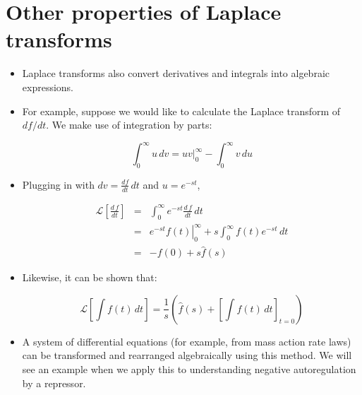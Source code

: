 \documentclass{article}
\newcommand{\Lapl}{\mathcal{L}}
\begin{document}
\section*{Other properties of Laplace transforms}
\begin{itemize}
\item  Laplace transforms also convert derivatives and integrals into algebraic expressions.
\item For example, suppose we would like to calculate the Laplace transform of $df/dt$. We make use of integration by parts:

\[ \int_0^{\infty} u \, dv = \left. uv \right|_0^{\infty} - \int_0^{\infty} v \, du \]

\item Plugging in with  $dv = \frac{df}{dt} \, dt$ and $u = e^{-st}$,

\begin{eqnarray*}
\Lapl \left[ \frac{d\, f}{dt} \right]  & = & \int_0^{\infty} e^{-s t} \frac{d\, f}{dt} \, dt\\
& = & \left. e^{-s t} f(t) \right|_0^{\infty} + s \int_0^{\infty} f(t) e^{-st} \, dt\\
& = &  -f(0) + s \hat{f}(s)
\end{eqnarray*}

\item Likewise, it can be shown that:

\[ \Lapl \left[ \int f(t) \, dt \right] = \frac{1}{s} \left( \hat{f}(s) + \left[ \int f(t) \, dt \right]_{t=0} \right) \]

\item A system of differential equations (for example, from mass action rate laws) can be transformed and rearranged algebraically using this method. We will see an example when we apply this to understanding negative autoregulation by a repressor.

\end{itemize}
\end{document}
